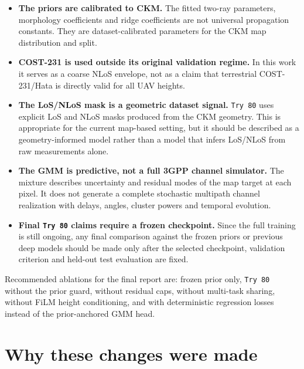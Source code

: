 \documentclass[11pt,a4paper]{article}
\begin{document}
\begin{itemize}
\item \textbf{The priors are calibrated to CKM.}
      The fitted two-ray parameters, morphology coefficients and ridge
      coefficients are not universal propagation constants. They are
      dataset-calibrated parameters for the CKM map distribution and split.

\item \textbf{COST-231 is used outside its original validation regime.}
      In this work it serves as a coarse NLoS envelope, not as a claim that
      terrestrial COST-231/Hata is directly valid for all UAV heights.

\item \textbf{The LoS/NLoS mask is a geometric dataset signal.}
      \texttt{Try 80} uses explicit LoS and NLoS masks produced from the CKM
      geometry. This is appropriate for the current map-based setting, but it
      should be described as a geometry-informed model rather than a model that
      infers LoS/NLoS from raw measurements alone.

\item \textbf{The GMM is predictive, not a full 3GPP channel simulator.}
      The mixture describes uncertainty and residual modes of the map target at
      each pixel. It does not generate a complete stochastic multipath channel
      realization with delays, angles, cluster powers and temporal evolution.

\item \textbf{Final \texttt{Try 80} claims require a frozen checkpoint.}
      Since the full training is still ongoing, any final comparison against
      the frozen priors or previous deep models should be made only after the
      selected checkpoint, validation criterion and held-out test evaluation
      are fixed.
\end{itemize}

Recommended ablations for the final report are: frozen prior only,
\texttt{Try 80} without the prior guard, without residual caps, without
multi-task sharing, without FiLM height conditioning, and with deterministic
regression losses instead of the prior-anchored GMM head.

\section{Why these changes were made}
\end{document}
